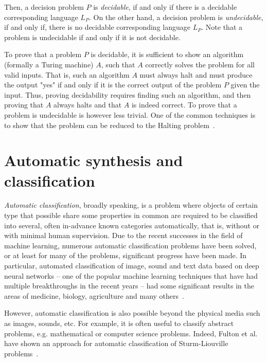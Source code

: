 Then, a decision problem $P$ is \emph{decidable}, if and only if
there is a decidable corresponding language $L_P$.
On the other hand, a decision problem is \emph{undecidable},
if and only if, there is no decidable corresponding language $L_P$.
Note that a problem is undecidable if and only if it is not
decidable.

To prove that a problem $P$ is decidable, it is sufficient to
show an algorithm (formally a Turing machine) $A$, such that
$A$ correctly solves the problem for all valid inputs. That is,
such an algorithm $A$ must always halt and must produce the
output "yes" if and only if it is the correct output of the
problem $P$ given the input. Thus, proving decidability
requires finding such an algorithm, and then proving
that $A$ always halts and that $A$ is indeed correct.
To prove that a problem is undecidable is however less
trivial. One of the common techniques is to show that
the problem can be reduced to the Halting problem~\cite{Margenstern2000, Turing1937}.

\section{Automatic synthesis and classification}

\emph{Automatic classification}, broadly speaking, is a problem
where objects of certain type that possible share some
properties in common are required to be classified into
several, often in-advance known categories automatically,
that is, without or with minimal human supervision.
Due to the recent successes in the field of machine learning,
numerous automatic classification problems have been solved,
or at least for many of the problems, significant
progress have been made. In particular, automated classification
of image, sound and text data
based on deep neural networks -- one of the popular machine learning
techniques that have had multiple breakthroughs in the recent years --
had some significant results in the areas of medicine, biology,
agriculture and many others~\cite{auto-class_Sharma2017,
auto-class_Capizzi2015, auto-class_Ibrahim2018, auto-class_Colonna2016,
auto-class_Winkler2017, auto-class_FabioDelFrate}.

However, automatic classification is also possible beyond
the physical media such as images, sounds, etc. For example,
it is often useful to classify abstract problems, e.g.
mathematical or computer science problems. Indeed,
Fulton et al.~\cite{class_Fulton} have shown an approach
for automatic classification of Sturm-Liouville
problems~\cite{zettl2010sturm}.

